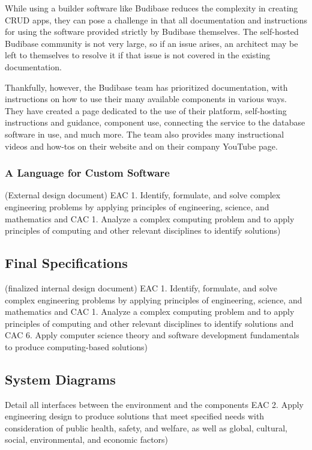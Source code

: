 \documentclass{article}
\begin{document}
While using a builder software like Budibase reduces the complexity in creating CRUD apps, they can pose a challenge in that all 
documentation and 
instructions for using the software provided strictly by Budibase themselves. The self-hosted Budibase community is not 
very large, so if an issue arises, an architect may be left to themselves to resolve it if that issue is not covered
in the existing documentation. 

Thankfully, however, the Budibase team has prioritized documentation, with instructions on how to use their many available 
components in various ways. They have created a page dedicated to the use of their platform, self-hosting instructions and guidance, 
component use, connecting the service to the database software in use, and much more. \cite{budibase-docs} The team also provides 
many instructional videos and how-tos on their website and on their company YouTube page. \cite{budibase-youtube}

\subsubsection{A Language for Custom Software}

(External design document) 
    EAC 1. Identify, formulate, and solve complex engineering problems by 
    applying principles of engineering, science, and mathematics and CAC 1. 
    Analyze a complex computing problem and to apply principles of computing 
    and other relevant disciplines to identify solutions) 

\subsection{Final Specifications}
(finalized internal design document) 
    EAC 1. Identify, formulate, and solve complex engineering problems by 
    applying principles of engineering, science, and mathematics and CAC 1. 
    Analyze a complex computing problem and to apply principles of computing 
    and other relevant disciplines to identify solutions and CAC 6. Apply 
    computer science theory and software development fundamentals to produce 
    computing-based solutions) 

\subsection{System Diagrams} 
Detail all interfaces between the environment and the components 
    EAC 2. Apply engineering design to produce solutions that meet specified 
    needs with consideration of public health, safety, and welfare, as well as 
    global, cultural, social, environmental, and economic factors) 
\end{document}
